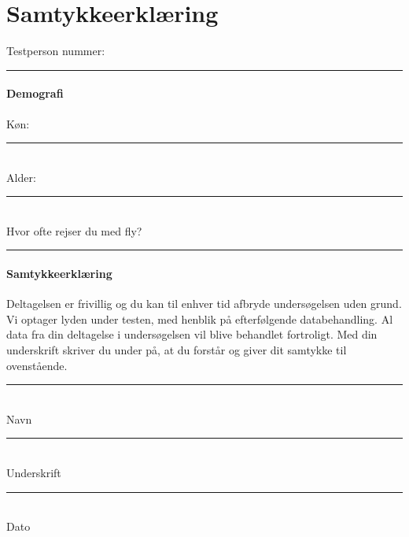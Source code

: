 \chapter{Samtykkeerklæring}
\label{ParametreSamtykkeerklaering}
%
Testperson nummer:\rule{2cm}{0.4pt}
%
\subsubsection*{Demografi}
%
Køn:\rule{2cm}{0.4pt}\\
Alder:\rule{2cm}{0.4pt}\\
Hvor ofte rejser du med fly? \rule{10cm}{0.4pt} 


\subsubsection*{Samtykkeerklæring}
%
Deltagelsen er frivillig og du kan til enhver tid afbryde undersøgelsen uden grund. Vi optager lyden under testen, med henblik på efterfølgende databehandling. Al data fra din deltagelse i undersøgelsen vil blive behandlet fortroligt. \blankline
%
Med din underskrift skriver du under på, at du forstår og giver dit samtykke til ovenstående.\blankline
%
\rule{10cm}{0.4pt}\\
Navn\blankline
%
\rule{10cm}{0.4pt}\\
Underskrift\blankline
%
\rule{4cm}{0.4pt}\\
Dato


